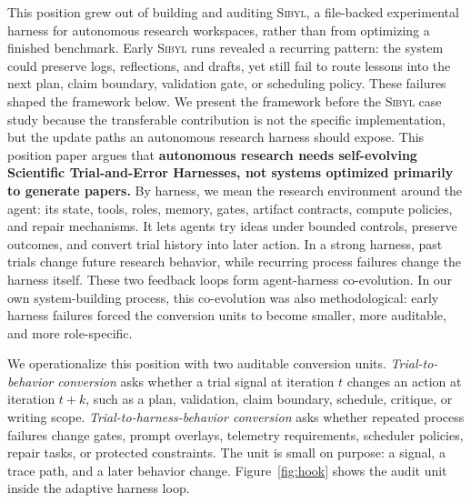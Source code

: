 \documentclass{article}
\newcommand{\sibyl}{\textsc{Sibyl}}
\begin{document}
This position grew out of building and auditing \sibyl{}, a file-backed experimental harness for autonomous research workspaces, rather than from optimizing a finished benchmark. Early \sibyl{} runs revealed a recurring pattern: the system could preserve logs, reflections, and drafts, yet still fail to route lessons into the next plan, claim boundary, validation gate, or scheduling policy. These failures shaped the framework below. We present the framework before the \sibyl{} case study because the transferable contribution is not the specific implementation, but the update paths an autonomous research harness should expose.
This position paper argues that \textbf{autonomous research needs self-evolving Scientific Trial-and-Error Harnesses, not systems optimized primarily to generate papers.} 
By harness, we mean the research environment around the agent: its state, tools, roles, memory, gates, artifact contracts, compute policies, and repair mechanisms. It lets agents try ideas under bounded controls, preserve outcomes, and convert trial history into later action. In a strong harness, past trials change future research behavior, while recurring process failures change the harness itself. These two feedback loops form agent-harness co-evolution. In our own system-building process, this co-evolution was also methodological: early harness failures forced the conversion units to become smaller, more auditable, and more role-specific.

We operationalize this position with two auditable conversion units. \emph{Trial-to-behavior conversion} asks whether a trial signal at iteration $t$ changes an action at iteration $t+k$, such as a plan, validation, claim boundary, schedule, critique, or writing scope. \emph{Trial-to-harness-behavior conversion} asks whether repeated process failures change gates, prompt overlays, telemetry requirements, scheduler policies, repair tasks, or protected constraints. The unit is small on purpose: a signal, a trace path, and a later behavior change. Figure~\ref{fig:hook} shows the audit unit inside the adaptive harness loop.
\end{document}
